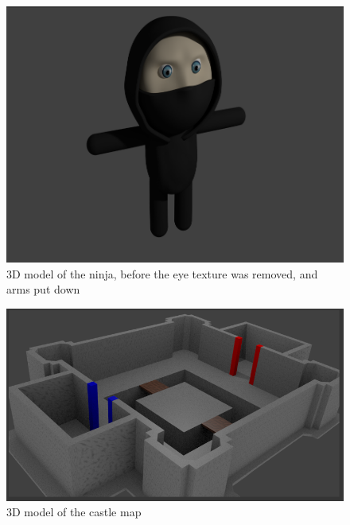 \documentclass[12pt,a4paper,titlepage]{article}
\begin{document}
\begin{figure}[h]
      \centering
      \includegraphics[width=\textwidth]{char1.png}
      \caption{3D model of the ninja, before the eye texture was removed, and
      arms put down}
\end{figure}

\begin{figure}[h]
      \centering
      \includegraphics[width=\textwidth]{map1.png}
      \caption{3D model of the castle map}
\end{figure}
\end{document}
